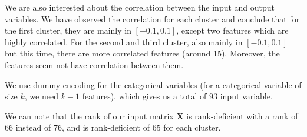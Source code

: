 \documentclass{article} %
\begin{document}
We are also interested about the correlation between the input and output variables. We have observed the correlation for each cluster and conclude that for the first cluster, they are mainly in $[-0.1,0.1]$, except two features which are highly correlated. For the second and third cluster, also mainly in $[-0.1,0.1]$ but this time, there are more correlated features (around 15). Moreover, the features seem not have correlation between them.

We use dummy encoding for the categorical variables (for a categorical variable of size $k$, we need $k-1$ features), which gives us a total of $93$ input variable.

We can note that the rank of our input matrix $\mathbf{X}$ is rank-deficient with a rank of 66 instead of 76, and is rank-deficient of 65 for each cluster.
\end{document}
